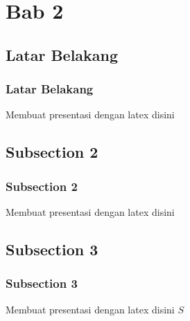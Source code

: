 \section{Bab 2}
\subsection{Latar Belakang}
\begin{frame}
\frametitle{Latar Belakang}
Membuat presentasi dengan latex disini
\end{frame}

\subsection{Subsection 2}
\begin{frame}
\frametitle{Subsection 2}
Membuat presentasi dengan latex disini
\end{frame}

\subsection{Subsection 3}
\begin{frame}
\frametitle{Subsection 3}
Membuat presentasi dengan latex disini $S$
\end{frame}